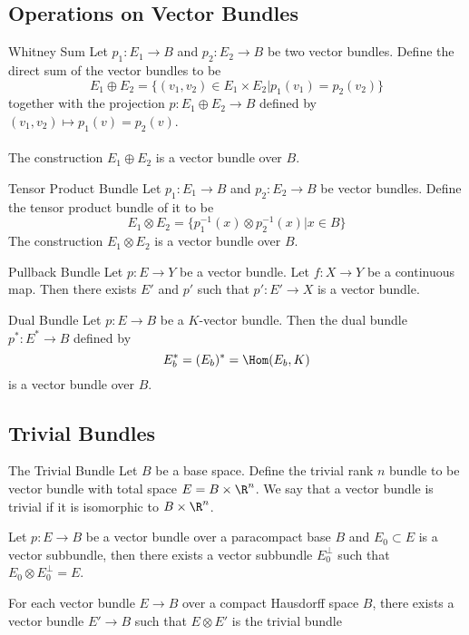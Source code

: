 \documentclass[a4paper]{article}
\begin{document}
\subsection{Operations on Vector Bundles}
\begin{thm}{Whitney Sum}{} Let $p_1:E_1\to B$ and $p_2:E_2\to B$ be two vector bundles. Define the direct sum of the vector bundles to be $$E_1\oplus E_2=\{(v_1,v_2)\in E_1\times E_2|p_1(v_1)=p_2(v_2)\}$$ together with the projection $p:E_1\oplus E_2\to B$ defined by $(v_1,v_2)\mapsto p_1(v)=p_2(v)$. \\~\\
The construction $E_1\oplus E_2$ is a vector bundle over $B$. 
\end{thm}

\begin{prp}{Tensor Product Bundle}{} Let $p_1:E_1\to B$ and $p_2:E_2\to B$ be vector bundles. Define the tensor product bundle of it to be $$E_1\otimes E_2=\{p_1^{-1}(x)\otimes p_2^{-1}(x)|x\in B\}$$ The construction $E_1\otimes E_2$ is a vector bundle over $B$. 
\end{prp}

\begin{thm}{Pullback Bundle}{} Let $p:E\to Y$ be a vector bundle. Let $f:X\to Y$ be a continuous map. Then there exists $E'$ and $p'$ such that $p':E'\to X$ is a vector bundle. 
\end{thm}

\begin{thm}{Dual Bundle}{} Let $p:E\to B$ be a $K$-vector bundle. Then the dual bundle $p^\ast:E^\ast\to B$ defined by $$E_b^\ast=(E_b)^\ast=\Hom(E_b,K)$$ is a vector bundle over $B$. 
\end{thm}

\subsection{Trivial Bundles}
\begin{defn}{The Trivial Bundle}{} Let $B$ be a base space. Define the trivial rank $n$ bundle to be vector bundle with total space $E=B\times\R^n$. We say that a vector bundle is trivial if it is isomorphic to $B\times\R^n$. 
\end{defn}

\begin{prp}{}{} Let $p:E\to B$ be a vector bundle over a paracompact base $B$ and $E_0\subset E$ is a vector subbundle, then there exists a vector subbundle $E_0^\perp$ such that $E_0\otimes E_0^\perp=E$. 
\end{prp}

\begin{prp}{}{} For each vector bundle $E\to B$ over a compact Hausdorff space $B$, there exists a vector bundle $E'\to B$ such that $E\otimes E'$ is the trivial bundle
\end{prp}
\end{document}
